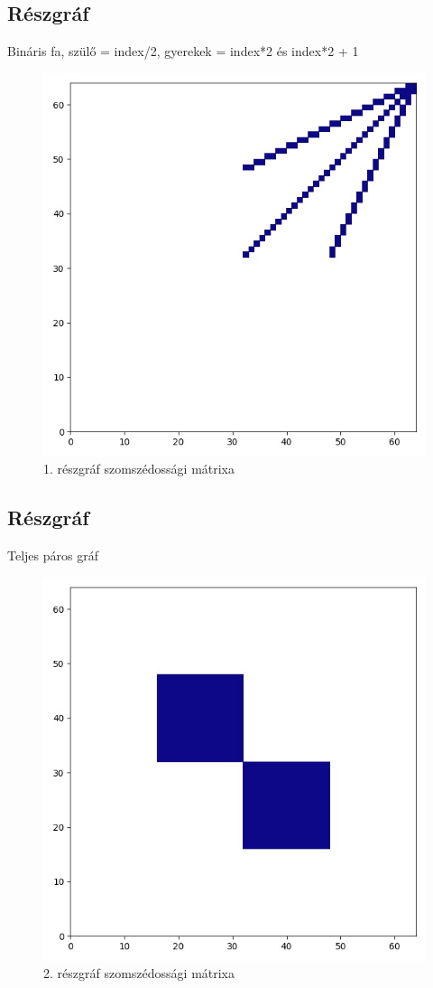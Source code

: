\documentclass[14pt,a4paper]{article}
\begin{document}
\subsection{Részgráf}
Bináris fa, szülő = index/2, gyerekek = index*2 és index*2 + 1
\begin{figure}[H]
\centering
\includegraphics[width = 0.7\columnwidth]{subgraph_01.jpg}
\caption{1. részgráf szomszédossági mátrixa}
\end{figure}
\subsection{Részgráf}
Teljes páros gráf
\begin{figure}[H]
\centering
\includegraphics[width = 0.7\columnwidth]{subgraph_02.jpg}
\caption{2. részgráf szomszédossági mátrixa}
\end{figure}
\end{document}

